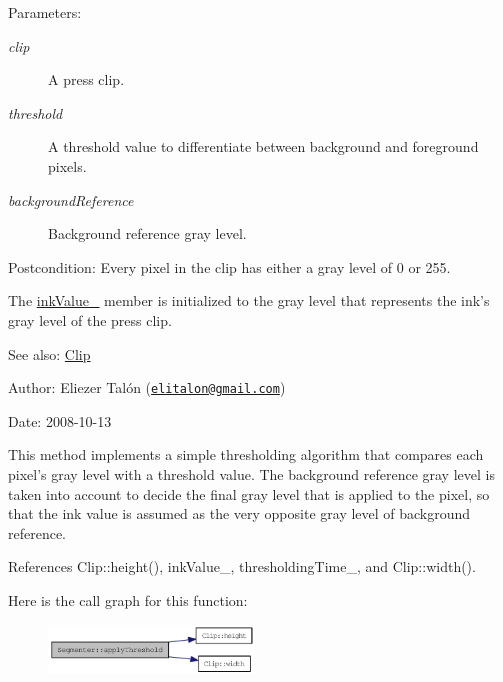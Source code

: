 \begin{Desc}
\item[Parameters:]
\begin{description}
\item[{\em clip}]A press clip. \item[{\em threshold}]A threshold value to differentiate between background and foreground pixels. \item[{\em backgroundReference}]Background reference gray level.\end{description}
\end{Desc}
\begin{Desc}
\item[Postcondition:]Every pixel in the clip has either a gray level of 0 or 255. 

The \hyperlink{class_segmenter_fa6183f99aa6011399783652b341a43b}{inkValue\_\-} member is initialized to the gray level that represents the ink's gray level of the press clip.\end{Desc}
\begin{Desc}
\item[See also:]\hyperlink{class_clip}{Clip}\end{Desc}
\begin{Desc}
\item[Author:]Eliezer Talón (\href{mailto:elitalon@gmail.com}{\tt elitalon@gmail.com}) \end{Desc}
\begin{Desc}
\item[Date:]2008-10-13\end{Desc}
This method implements a simple thresholding algorithm that compares each pixel's gray level with a threshold value. The background reference gray level is taken into account to decide the final gray level that is applied to the pixel, so that the ink value is assumed as the very opposite gray level of background reference. 

References Clip::height(), inkValue\_\-, thresholdingTime\_\-, and Clip::width().

Here is the call graph for this function:\nopagebreak
\begin{figure}[H]
\begin{center}
\leavevmode
\includegraphics[width=155pt]{class_segmenter_6854315e3320f9d9a8ece14cbb8570ee_cgraph}
\end{center}
\end{figure}


